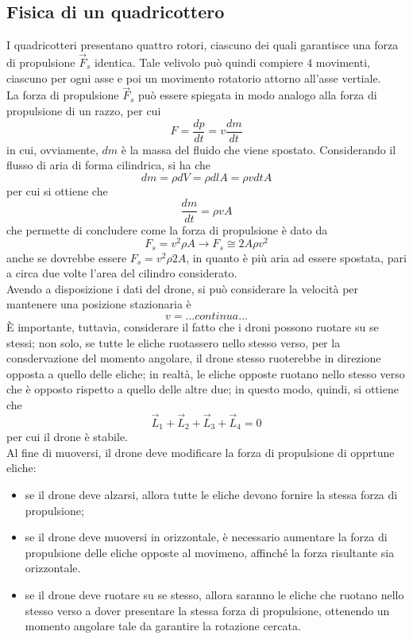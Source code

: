 \documentclass[a4paper]{extarticle}
\begin{document}
\vspace{1em}
\subsection{Fisica di un quadricottero}
I quadricotteri presentano quattro rotori, ciascuno dei quali garantisce una forza di propulsione $\vec F_s$ identica. Tale velivolo può quindi compiere $4$ movimenti, ciascuno per ogni asse e poi un movimento rotatorio attorno all'asse vertiale.\\
La forza di propulsione $\vec F_s$ può essere spiegata in modo analogo alla forza di propulsione di un razzo, per cui
\[F=\frac{dp}{dt}=v \frac{dm}{dt}\]
in cui, ovviamente, $dm$ è la massa del fluido che viene spostato. Considerando il flusso di aria di forma cilindrica, si ha che
\[dm=\rho dV = \rho dl A = \rho v dt A\]
per cui si ottiene che
\[\frac{dm}{dt}=\rho v A\]
che permette di concludere come la forza di propulsione è dato da
\[\boxed{F_s=v^2 \rho A} \longrightarrow F_s \cong 2A \rho v^2\]
anche se dovrebbe essere $F_s=v^2 \rho 2A$, in quanto è più aria ad essere spostata, pari a circa due volte l'area del cilindro considerato.\\
Avendo a disposizione i dati del drone, si può considerare la velocità per mantenere una posizione stazionaria è
\[v=...continua...\]
È importante, tuttavia, considerare il fatto che i droni possono ruotare su se stessi; non solo, se tutte le eliche ruotassero nello stesso verso, per la consdervazione del momento angolare, il drone stesso ruoterebbe in direzione opposta a quello delle eliche; in realtà, le eliche opposte ruotano nello stesso verso che è opposto rispetto a quello delle altre due; in questo modo, quindi, si ottiene che
\[\vec L_1 + \vec L_2 + \vec L_3 + \vec L_4 = 0\]
per cui il drone è stabile.\\
Al fine di muoversi, il drone deve modificare la forza di propulsione di opprtune eliche:
\begin{itemize}
  \item se il drone deve alzarsi, allora tutte le eliche devono fornire la stessa forza di propulsione;
  \item se il drone deve muoversi in orizzontale, è necessario aumentare la forza di propulsione delle eliche opposte al movimeno, affinché la forza risultante sia orizzontale.
  \item se il drone deve ruotare su se stesso, allora saranno le eliche che ruotano nello stesso verso a dover presentare la stessa forza di propulsione, ottenendo un momento angolare tale da garantire la rotazione cercata.
\end{itemize}
\end{document}
